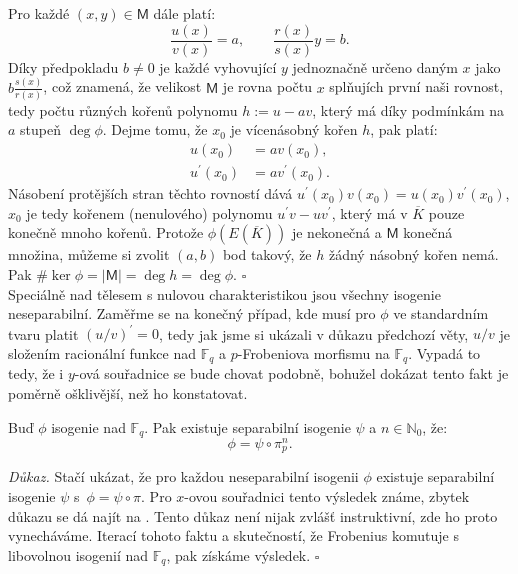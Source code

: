 \documentclass[12pt]{report}
\begin{document}
Pro každé $(x,y) \in \mathsf{M}$ dále platí:
\begin{equation*}
\frac{u(x)}{v(x)} = a, \qquad \frac{r(x)}{s(x)}y = b.
\end{equation*}
Díky předpokladu $b \neq 0$ je každé vyhovující $y$ jednoznačně určeno daným $x$ jako $b \frac{s(x)}{r(x)}$, což znamená, že velikost $\mathsf{M}$ je rovna počtu $x$ splňujích první naši rovnost, tedy počtu různých kořenů polynomu $h:= u - av$, který má díky podmínkám na $a$ stupeň $\deg \phi$. Dejme tomu, že $x_0$ je vícenásobný kořen $h$, pak platí:
\begin{align*}
u(x_0) &= a v(x_0),\\
u^{\prime} (x_0)  &=  a v^{\prime} (x_0).
\end{align*}  
Násobení protějších stran těchto rovností dává $u^{\prime} (x_0) v (x_0) = u (x_0) v^{\prime} (x_0)$, $x_0$ je tedy kořenem (nenulového) polynomu $u^\prime v - u v^\prime$, který má v $\overline{K}$ pouze konečně mnoho kořenů. Protože $\phi(E(\overline{K}))$ je nekonečná a $\mathsf{M}$ konečná množina, můžeme si zvolit $(a,b)$ bod takový, že $h$ žádný násobný kořen nemá. Pak $\# \ker \phi = \vert \mathsf{M}\vert = \deg h = \deg \phi$. \hfill $\square$\\

Speciálně nad tělesem s nulovou charakteristikou jsou všechny isogenie neseparabilní. Zaměřme se na konečný případ, kde musí pro $\phi$ ve standardním tvaru platit $(u/v)^\prime =0$, tedy jak jsme si ukázali v důkazu předchozí věty, $u/v$ je složením racionální funkce nad $\mathbb{F}_q$ a $p$-Frobeniova morfismu na $\mathbb{F}_q$. Vypadá to tedy, že i $y$-ová souřadnice se bude chovat podobně, bohužel dokázat tento fakt je poměrně ošklivější, než ho konstatovat. 

\begin{dusledek}\label{separ2}
Buď $\phi$ isogenie nad $\mathbb{F}_q$. Pak existuje separabilní isogenie $\psi$ a $n \in \mathbb{N}_0$, že:
\begin{equation*}
\phi = \psi \circ \pi_p ^n.
\end{equation*}
\end{dusledek}

\noindent \textit{Důkaz.} Stačí ukázat, že pro každou neseparabilní isogenii $\phi$ existuje separabilní isogenie $\psi$ s~$\phi = \psi \circ \pi$. Pro $x$-ovou souřadnici tento výsledek známe, zbytek důkazu se dá najít na \cite[Lemma 6.3.]{Sutherland}. Tento důkaz není nijak zvlášť instruktivní, zde ho proto vynecháváme. Iterací tohoto faktu a skutečností, že Frobenius komutuje s libovolnou isogenií nad $\mathbb{F}_q$, pak získáme výsledek. \hfill $\square$\\
\end{document}
